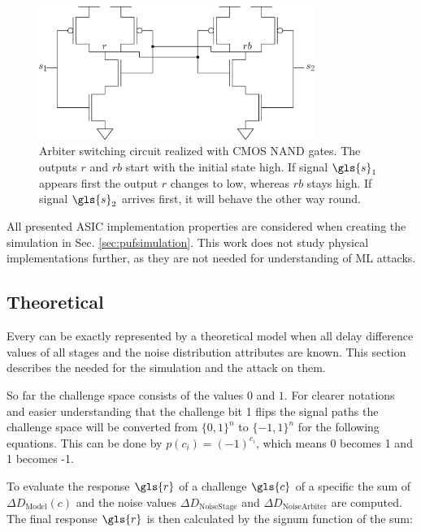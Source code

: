 \begin{figure}[ht]
\centering
\includegraphics[width=0.80\textwidth]{images/arbiter_circuit.eps}
\caption[Arbiter circuit]{Arbiter switching circuit realized with \ac{CMOS} NAND gates. The outputs $r$ and $rb$ start with the initial state high. If signal $\gls{s}_1$ appears first the output $r$ changes to low, whereas $rb$ stays high. If signal $\gls{s}_2$ arrives first, it will behave the other way round.}
\label{fig:nandarbiter}
\end{figure}

All presented \apuf \ac{ASIC} implementation properties are considered when creating the \apuf simulation in Sec. \ref{sec:pufsimulation}.
This work does not study physical \apuf implementations further, as they are not needed for understanding of \ac{ML} attacks.


\subsection{Theoretical}
\label{sec:theoretical}

Every \apuf can be exactly represented by a theoretical model when all delay difference values of all stages and the noise distribution attributes are known.
This section describes the \apufs needed for the simulation and the attack on them.

So far the challenge space consists of the values $0$ and $1$.
For clearer notations and easier understanding that the challenge bit 1 flips the signal paths the challenge space will be converted from $\{0, 1\}^n$ to $\{-1, 1\}^n$ for the following equations.
This can be done by $p(c_i) = (-1)^{c_i}$, which means 0 becomes 1 and 1 becomes -1.

To evaluate the response $\gls{r}$ of a challenge $\gls{c}$ of a specific \puf the sum of $\Delta D_{\mathrm{Model}}(c)$ and the noise values $\Delta D_{\mathrm{Noise Stage}}$ and $\Delta D_{\mathrm{Noise Arbiter}}$ are computed.
The final response $\gls{r}$ is then calculated by the signum function of the sum:

